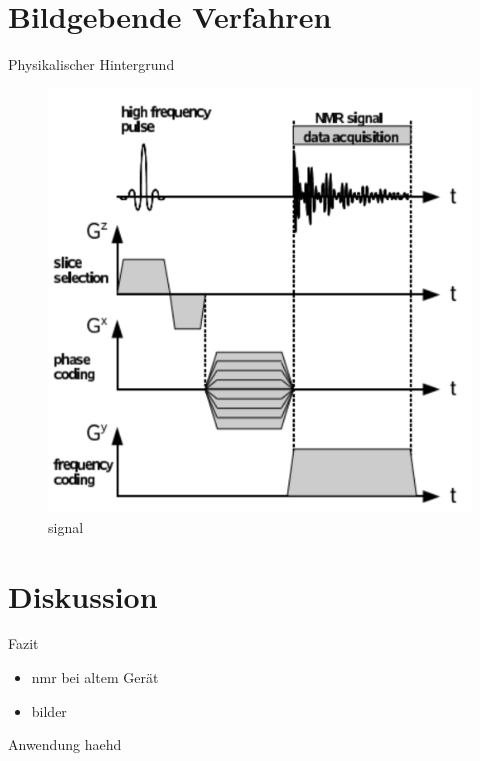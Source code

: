 \section{Bildgebende Verfahren} %
\begin{frame}{Physikalischer Hintergrund}
\begin{figure}
\centering
\includegraphics[scale=.1]{images//signal.png}
\caption{signal}
\end{figure}
\end{frame}




\section{Diskussion}
\begin{frame}{Fazit}
	\begin{exampleblock}
	\begin{itemize}
	\item nmr bei altem Gerät
	\item bilder
	\end{itemize}
	\end{exampleblock}
\end{frame}

\begin{frame}{Anwendung}
haehd
\end{frame}